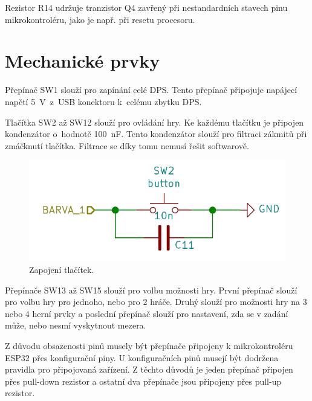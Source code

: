   Rezistor R14 udržuje tranzistor Q4 zavřený při nestandardních stavech pinu mikrokontroléru, jako je např. při resetu procesoru.

  \section{Mechanické prvky}
  Přepínač SW1 slouží pro zapínání celé DPS. Tento přepínač připojuje napájecí napětí 5~V~z~USB konektoru k~celému zbytku DPS. 

  Tlačítka SW2 až SW12 slouží pro ovládání hry. Ke každému tlačítku je připojen kondenzátor o~hodnotě 100~nF. Tento kondenzátor 
  slouží pro filtraci zákmitů při zmáčknutí tlačítka. Filtrace se díky tomu nemusí řešit softwarově.

  \begin{figure}[!h]
    \begin{center}
      \includegraphics[scale=0.6]{obrazky/Tlacitka_zapojeni.png}
    \end{center}
    \caption[Zapojení tlačítek]{Zapojení tlačítek.}
  \end{figure}

  Přepínače SW13 až SW15 slouží pro volbu možnosti hry. První přepínač slouží pro volbu hry pro jednoho, nebo pro 2 hráče. Druhý 
  slouží pro možnosti hry na 3 nebo 4 herní prvky a poslední přepínač slouží pro nastavení, zda se v zadání může, nebo 
  nesmí vyskytnout mezera. 
  
  Z důvodu obsazenosti pinů musely být přepínače připojeny k mikrokontroléru ESP32 přes konfigurační piny. U konfiguračních pinů
  musejí být dodržena pravidla pro připojovaná zařízení.
  Z těchto důvodů je jeden přepínač připojen přes pull-down rezistor a ostatní dva přepínače jsou připojeny přes pull-up rezistor. 

